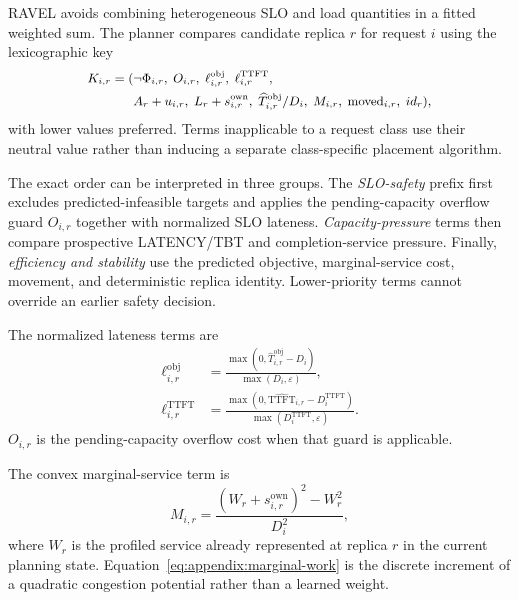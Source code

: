 \documentclass[letterpaper,twocolumn,10pt]{article}
\begin{document}
RAVEL avoids combining heterogeneous SLO and load quantities in a fitted
weighted sum.
The planner compares candidate replica $r$ for request $i$ using the
lexicographic key
\begin{equation}
\small
\begin{split}
    K_{i,r} =
    (&
      \neg\Phi_{i,r},\;
      O_{i,r},\;
      \ell^{\mathrm{obj}}_{i,r},\;
      \ell^{\mathrm{TTFT}}_{i,r},\\
     &A_r+u_{i,r},\;
      L_r+s^{\mathrm{own}}_{i,r},\;
      \widehat{T}^{\mathrm{obj}}_{i,r}/D_i,\;
      M_{i,r},\;
      \mathrm{moved}_{i,r},\;
      id_r
    ),
    \label{eq:appendix:placement-key}
\end{split}
\end{equation}
with lower values preferred.
Terms inapplicable to a request class use their neutral value rather than
inducing a separate class-specific placement algorithm.

The exact order can be interpreted in three groups.
The \emph{SLO-safety} prefix first excludes predicted-infeasible targets and
applies the pending-capacity overflow guard $O_{i,r}$ together with normalized
SLO lateness.
\emph{Capacity-pressure} terms then compare prospective LATENCY/TBT and
completion-service pressure.
Finally, \emph{efficiency and stability} use the predicted objective,
marginal-service cost, movement, and deterministic replica identity.
Lower-priority terms cannot override an earlier safety decision.

The normalized lateness terms are
\begin{align}
    \ell^{\mathrm{obj}}_{i,r}
    &=
    \frac{
        \max(0,\widehat{T}^{\mathrm{obj}}_{i,r}-D_i)
    }{\max(D_i,\varepsilon)},
    \label{eq:appendix:objective-lateness}\\
    \ell^{\mathrm{TTFT}}_{i,r}
    &=
    \frac{
        \max(0,\widehat{\mathrm{TTFT}}_{i,r}
                  -D_i^{\mathrm{TTFT}})
    }{\max(D_i^{\mathrm{TTFT}},\varepsilon)}.
    \label{eq:appendix:ttft-lateness}
\end{align}
$O_{i,r}$ is the pending-capacity overflow cost when that guard is applicable.

The convex marginal-service term is
\begin{equation}
    M_{i,r}
    =
    \frac{
       (W_r+s^{\mathrm{own}}_{i,r})^2-W_r^2
    }{D_i^2},
    \label{eq:appendix:marginal-work}
\end{equation}
where $W_r$ is the profiled service already represented at replica $r$ in the
current planning state.
Equation~\ref{eq:appendix:marginal-work} is the discrete increment of a
quadratic congestion potential rather than a learned weight.
\end{document}
